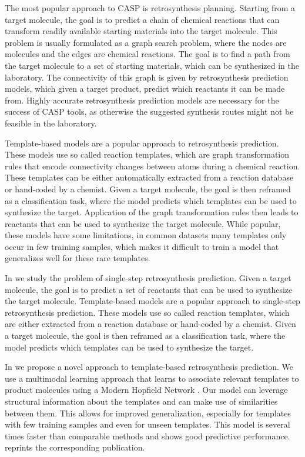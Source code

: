 The most popular approach to CASP is retrosynthesis planning. Starting from a
target molecule, the goal is to predict a chain of chemical reactions that can
transform readily available starting materials into the target molecule. This
problem is usually formulated as a graph search problem, where the nodes are
molecules and the edges are chemical reactions. The goal is to find a path from
the target molecule to a set of starting materials, which can be synthesized in
the laboratory. The connectivity of this graph is given by retrosynthesis
prediction models, which given a target product, predict which reactants it can
be made from. Highly accurate retrosynthesis prediction models are necessary for
the success of CASP tools, as otherwise the suggested synthesis routes might not
be feasible in the laboratory.

Template-based models are a popular approach to retrosynthesis prediction. These
models use so called reaction templates, which are graph transformation rules 
that encode connectivity changes between atoms during a chemical reaction. These 
templates can be either automatically extracted from a reaction database or
hand-coded by a chemist. Given a target molecule, the goal is then reframed as a
classification task, where the model predicts which templates can be used to
synthesize the target. Application of the graph transformation rules then leads
to reactants that can be used to synthesize the target molecule. While popular, 
these models have some limitations, in common datasets many templates only occur 
in few training samples, which makes it difficult to train a model that generalizes
well for these rare templates.

In \citep{seidlImprovingFewZeroShot2022} we study the problem of single-step
retrosynthesis prediction. Given a target molecule, the goal is to predict a
set of reactants that can be used to synthesize the target molecule.
Template-based models are a popular approach to single-step retrosynthesis
prediction. These models use so called reaction templates, which are
either extracted from a reaction database or hand-coded by a chemist.
Given a target molecule, the goal is then reframed as a classification task,
where the model predicts which templates can be used to synthesize the target.

In \citep{seidlImprovingFewZeroShot2022} we propose a novel approach to
template-based retrosynthesis prediction. We use a multimodal learning approach
that learns to associate relevant templates to product molecules using a Modern
Hopfield Network \citep{ramsauerHopfieldNetworksAll2020}. Our model can leverage
structural information about the templates and can make use of similarities
between them. This allows for improved generalization, especially for templates
with few training samples and even for unseen templates. This model is several
times faster than comparable methods and shows good predictive performance.
 reprints the corresponding publication.

